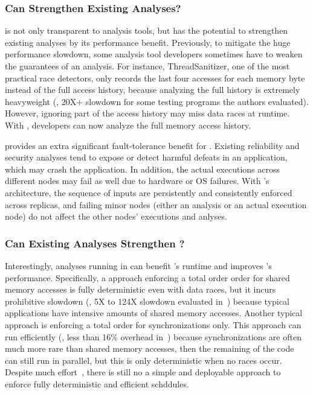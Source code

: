 \subsubsection{Can \xxx Strengthen Existing Analyses?} 
\label{sec:strengthen-analysis}

\xxx is not only transparent to analysis tools, but has the potential to 
strengthen existing analyses by its performance benefit. Previously, to 
mitigate the huge performance slowdown, some analysis tool developers sometimes 
have to weaken the guarantees of an analysis. For instance, 
ThreadSanitizer\cite{tsan}, one of the most practical race detectors, only 
records the last four accesses for each memory byte instead of the full access 
history, because analyzing the full history is extremely heavyweight 
(\eg, 20X+ slowdown for some testing programs the authors evaluated). However, 
ignoring part of the access history may miss data races at runtime. With \xxx, 
developers can now analyze the full memory access history.

\smr provides an extra significant fault-tolerance benefit for \xxx. Existing 
reliability and security analyses tend to expose or detect harmful defeats in 
an application, which may crash the application. In addition, the actual 
executions across different nodes may fail as well due to hardware or OS 
failures. With \xxx's \smr architecture, the sequence of inputs are 
persistently and consistently enforced across replicas, and failing minor 
nodes (either an analysis or an actual execution node) do not affect the other 
nodes' executions and anlyses.

\subsubsection{Can Existing Analyses Strengthen \xxx?} 
\label{sec:strengthen-crane}

Interestingly, analyses running in \xxx can benefit \xxx's \dmt runtime and 
improves \xxx's performance. Specifically, a \dmt approach enforcing a total 
order order for shared memory accesses is fully deterministic even with data 
races, but it incurs prohibitive slowdown (\eg, 5X to 124X slowdown evaluated 
in~\cite{parrot:sosp13}) because typical applications have intensive amounts of 
shared memory accesses. Another typical \dmt approach is enforcing a total 
order for synchronizations only. This approach can run efficiently (\eg, less 
than 16\% overhead in~\cite{kendo:asplos09, tern:osdi10, parrot:sosp13}) 
because synchronizations are often much more rare than shared memory accesses, 
then the remaining of the code can still run in parallel, but this \dmt is only 
deterministic when no races occur. Despite much effort~\cite{dthreads:sosp11, 
peregrine:sosp11, determinator:osdi10}, there is still no a simple and 
deployable approach to enforce fully deterministic and efficient \dmt schddules.


